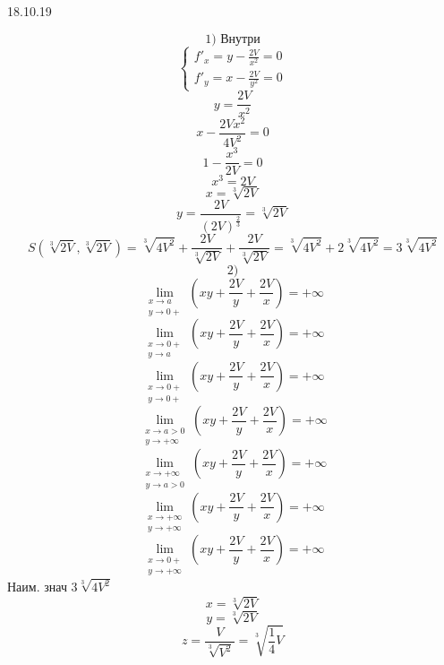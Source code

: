 \documentclass[matan.tex]{subfiles}
\begin{document}
\begin{lect}{18.10.19}
\begin{task}[2]
        \[1) \text{ Внутри}\]
        \[\begin{cases}
            f'_x = y - \frac{2V}{x^2} = 0\\
            f'_y = x - \frac{2V}{y^2} = 0
        \end{cases}\]
        \[y = \frac{2V}{x^2}\]
        \[x - \frac{2Vx^2}{4V^2} = 0\]
        \[1 - \frac{x^3}{2V} = 0\]
        \[x^3 = 2V\]
        \[x = \sqrt[3]{2V}\]
        \[y = \frac{2V}{(2V)^{\frac{2}{3}} } = \sqrt[3]{2V}\]
        \[S(\sqrt[3]{2V}, \sqrt[3]{2V}) = \sqrt[3]{4V^2} + \frac{2V}{\sqrt[3]{2V}} + 
        \frac{2V}{\sqrt[3]{2V}} = \sqrt[3]{4V^2} + 2 \sqrt[3]{4V^2} = 3\sqrt[3]{4V^2}\]
        \[2)\]
        \[\lim_{\substack{x \to a\\ y \to 0+}}
        (xy + \frac{2V}{y} + \frac{2V}{x}) = +\infty\]
        \[\lim_{\substack{x \to 0+ \\ y \to a}}(xy + \frac{2V}{y} + \frac{2V}{x}) = 
        +\infty\]
        \[\lim_{\substack{x \to 0+ \\ y \to 0 +}} (xy + \frac{2V}{y} + \frac{2V}{x}) =
        +\infty\]
        \[\lim_{\substack{x \to a > 0\\ y \to +\infty}}(xy + \frac{2V}{y} + \frac{2V}{x})
        = + \infty\]
        \[\lim_{\substack{x \to +\infty \\ y \to a > 0}}(xy + \frac{2V}{y} + \frac{2V}{x})
        = + \infty\]
        \[\lim_{\substack{x \to +\infty \\ y \to +\infty}}(xy + \frac{2V}{y} +
        \frac{2V}{x}) = +\infty \]
        \[\lim_{\substack{x \to 0+ \\ y \to +\infty}} (xy + \frac{2V}{y} + \frac{2V}{x}) =
        +\infty\]
        Наим. знач $3\sqrt[3]{4V^2}$
        \[x = \sqrt[3]{2V}\]
        \[y = \sqrt[3]{2V}\]
        \[z = \frac{V}{\sqrt[3]{V^2}} = \sqrt[3]{\frac{1}{4}V}\]
    \end{task}
\end{lect}
\end{document}

